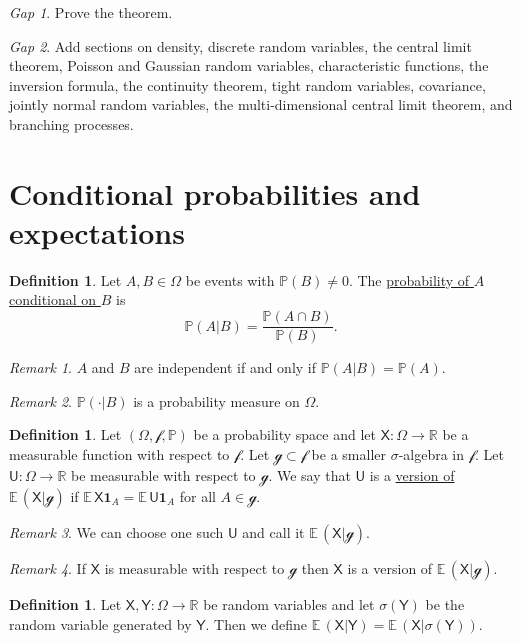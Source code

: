 \documentclass[11pt]{article}
\newcommand{\col}[1]{\mathscr{#1}}
\newcommand{\rv}[1]{\mathsf{#1}}
\newcommand{\p}{\mathbb{P}}
\newcommand{\ex}{\mathbb{E}\,}
\newcommand{\ind}[1]{\mathbf{1}_{#1}}
\newcommand{\defname}[1]{\underline{#1}}
\newcommand{\RR}{\mathbb{R}}
\theoremstyle{theorem}
\theoremstyle{definition}
\newtheorem{definition}[theorem]{Definition}
\theoremstyle{remark}
\newtheorem*{remark}{Remark}
\theoremstyle{step}
\theoremstyle{gap}
\newtheorem*{gap}{Gap}
\begin{document}
\begin{gap}
Prove the theorem.
\end{gap}

\begin{gap}
Add sections on density, discrete random variables, the central limit theorem, Poisson and Gaussian random variables, characteristic functions, the inversion formula, the continuity theorem, tight random variables, covariance, jointly normal random variables, the multi-dimensional central limit theorem, and branching processes.
\end{gap}

\section{Conditional probabilities and expectations}

\begin{definition}
Let \(A,B\in\Omega\) be events with \(\p(B)\neq 0\). The \defname{probability of \(A\) conditional on \(B\)} is
\[\p(A|B) = \frac{\p(A \cap B)}{\p(B)}.\]
\end{definition}

\begin{remark}
\(A\) and \(B\) are independent if and only if \(\p(A|B) = \p(A)\).
\end{remark}

\begin{remark}
\(\p(\cdot|B)\) is a probability measure on \(\Omega\).
\end{remark}

\begin{definition}
Let \((\Omega, \col{f}, \p)\) be a probability space and let \(\rv{X}:\Omega \to \RR\) be a measurable function with respect to \(\col{f}\). Let \(\col{g} \subset \col{f}\) be a smaller \(\sigma\)-algebra in \(\col{f}\). Let \(\rv{U}:\Omega\to\RR\) be measurable with respect to \(\col{g}\). We say that \(\rv{U}\) is a \defname{version of \(\ex(\rv{X}|\col{g})\)} if \(\ex \rv{X} \ind{A} = \ex \rv{U} \ind{A}\) for all \(A \in \col{g}\).
\end{definition}

\begin{remark}
We can choose one such \(\rv{U}\) and call it \(\ex(\rv{X}|\col{g})\).
\end{remark}

\begin{remark}
If \(\rv{X}\) is measurable with respect to \(\col{g}\) then \(\rv{X}\) is a version of \(\ex(\rv{X}|\col{g})\).
\end{remark}

\begin{definition}
Let \(\rv{X}, \rv{Y} : \Omega \to \RR\) be random variables and let \(\sigma(\rv{Y})\) be the random variable generated by \(\rv{Y}\). Then we define \(\ex(\rv{X}|\rv{Y}) = \ex(\rv{X}|\sigma(\rv{Y}))\).
\end{definition}
\end{document}
